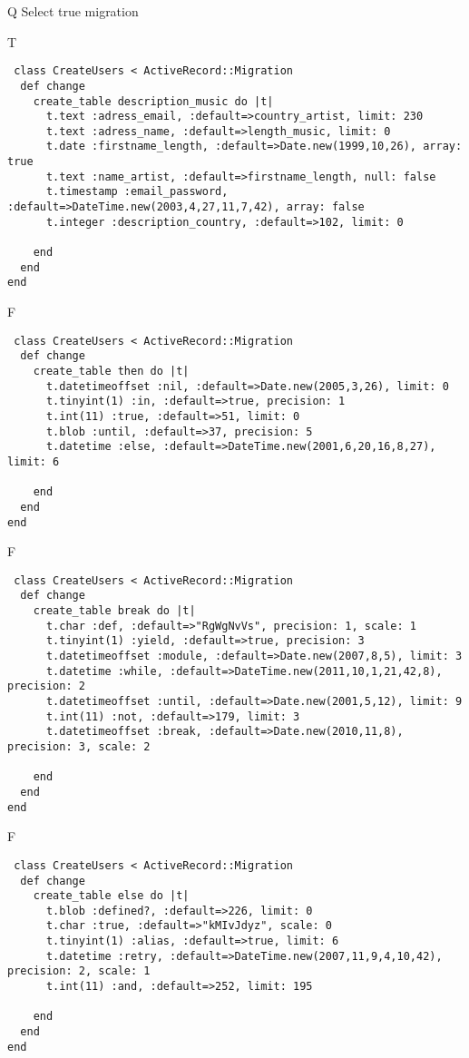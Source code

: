 Q
Select true migration

T
\begin{verbatim}
 class CreateUsers < ActiveRecord::Migration 
  def change 
    create_table description_music do |t| 
      t.text :adress_email, :default=>country_artist, limit: 230
      t.text :adress_name, :default=>length_music, limit: 0
      t.date :firstname_length, :default=>Date.new(1999,10,26), array: true
      t.text :name_artist, :default=>firstname_length, null: false
      t.timestamp :email_password, :default=>DateTime.new(2003,4,27,11,7,42), array: false
      t.integer :description_country, :default=>102, limit: 0
   
    end 
  end 
end
\end{verbatim}

F
\begin{verbatim}
 class CreateUsers < ActiveRecord::Migration 
  def change 
    create_table then do |t| 
      t.datetimeoffset :nil, :default=>Date.new(2005,3,26), limit: 0
      t.tinyint(1) :in, :default=>true, precision: 1
      t.int(11) :true, :default=>51, limit: 0
      t.blob :until, :default=>37, precision: 5
      t.datetime :else, :default=>DateTime.new(2001,6,20,16,8,27), limit: 6
   
    end 
  end 
end
\end{verbatim}

F
\begin{verbatim}
 class CreateUsers < ActiveRecord::Migration 
  def change 
    create_table break do |t| 
      t.char :def, :default=>"RgWgNvVs", precision: 1, scale: 1
      t.tinyint(1) :yield, :default=>true, precision: 3
      t.datetimeoffset :module, :default=>Date.new(2007,8,5), limit: 3
      t.datetime :while, :default=>DateTime.new(2011,10,1,21,42,8), precision: 2
      t.datetimeoffset :until, :default=>Date.new(2001,5,12), limit: 9
      t.int(11) :not, :default=>179, limit: 3
      t.datetimeoffset :break, :default=>Date.new(2010,11,8), precision: 3, scale: 2
   
    end 
  end 
end
\end{verbatim}

F
\begin{verbatim}
 class CreateUsers < ActiveRecord::Migration 
  def change 
    create_table else do |t| 
      t.blob :defined?, :default=>226, limit: 0
      t.char :true, :default=>"kMIvJdyz", scale: 0
      t.tinyint(1) :alias, :default=>true, limit: 6
      t.datetime :retry, :default=>DateTime.new(2007,11,9,4,10,42), precision: 2, scale: 1
      t.int(11) :and, :default=>252, limit: 195
   
    end 
  end 
end
\end{verbatim}
